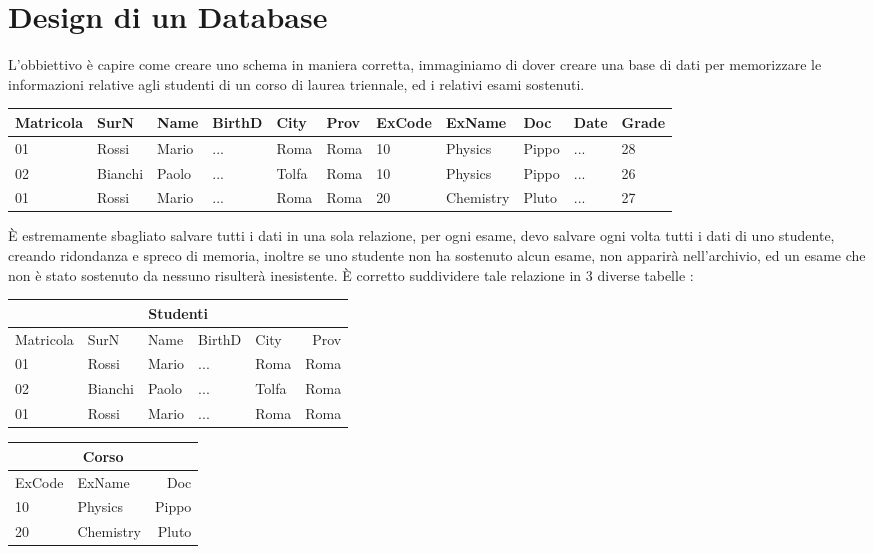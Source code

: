 \documentclass[12pt, letterpaper]{article}
\begin{document}
\section{Design di un Database}\label{Cap4}
L'obbiettivo è capire come creare uno schema in maniera corretta, immaginiamo di dover creare 
una base di dati per memorizzare le informazioni relative agli studenti di un corso di laurea 
triennale, ed i relativi esami sostenuti.\begin{center}
    \begin{tabular}{|l|l|l|l|l|l|l|l|l|l|l|}
        \hline
        Matricola  & SurN & Name & BirthD & City & Prov & ExCode & ExName & Doc & Date & Grade \\ \hline
        01  & Rossi & Mario & ... & Roma & Roma & 10 & Physics & Pippo & ... & 28 \\ \hline
        02  & Bianchi & Paolo & ... & Tolfa & Roma & 10 & Physics & Pippo & ... & 26 \\ \hline
        01  & Rossi & Mario & ... & Roma & Roma & 20 & Chemistry & Pluto & ... & 27 \\ \hline
        \end{tabular}
\end{center}
È estremamente sbagliato salvare tutti i dati in una sola relazione, per ogni esame, devo salvare 
ogni volta tutti i dati di uno studente, creando ridondanza e spreco di memoria, inoltre se uno studente
non ha sostenuto alcun esame, non apparirà nell'archivio, ed un esame che non è stato sostenuto da 
nessuno risulterà inesistente. È corretto suddividere tale relazione in 3 diverse tabelle :
\begin{center}
    \begin{tabular}{|l|l|l|l|l|r|}
        \hline
        \multicolumn{6}{|c|}{Studenti}   \\\hline
        Matricola  & SurN & Name & BirthD & City & Prov  \\ \hline
        01  & Rossi & Mario & ... & Roma & Roma \\ \hline
        02  & Bianchi & Paolo & ... & Tolfa & Roma  \\ \hline
        01  & Rossi & Mario & ... & Roma & Roma  \\ \hline
        \end{tabular}
        \begin{tabular}{|l|l|r|}
            \hline
            \multicolumn{3}{|c|}{Corso}   \\\hline
            ExCode  & ExName & Doc  \\ \hline
            10  & Physics & Pippo \\ \hline
            20  & Chemistry & Pluto\\ \hline
            \end{tabular}
\end{center}
\end{document}
